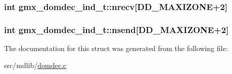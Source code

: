\hypertarget{structgmx__domdec__ind__t_a83ad371659b7b4286e6136217c7fa6e0}{
\subsubsection[{nrecv}]{\setlength{\rightskip}{0pt plus 5cm}int {\bf gmx\-\_\-domdec\-\_\-ind\-\_\-t\-::nrecv}\mbox{[}{\bf \-D\-D\-\_\-\-M\-A\-X\-I\-Z\-O\-N\-E}+2\mbox{]}}}\label{structgmx__domdec__ind__t_a83ad371659b7b4286e6136217c7fa6e0}
\hypertarget{structgmx__domdec__ind__t_a93988ceca48d7b6246b39f045796dbf2}{
\subsubsection[{nsend}]{\setlength{\rightskip}{0pt plus 5cm}int {\bf gmx\-\_\-domdec\-\_\-ind\-\_\-t\-::nsend}\mbox{[}{\bf \-D\-D\-\_\-\-M\-A\-X\-I\-Z\-O\-N\-E}+2\mbox{]}}}\label{structgmx__domdec__ind__t_a93988ceca48d7b6246b39f045796dbf2}


\-The documentation for this struct was generated from the following file\-:\begin{DoxyCompactItemize}
\item 
src/mdlib/\hyperlink{domdec_8c}{domdec.\-c}\end{DoxyCompactItemize}
